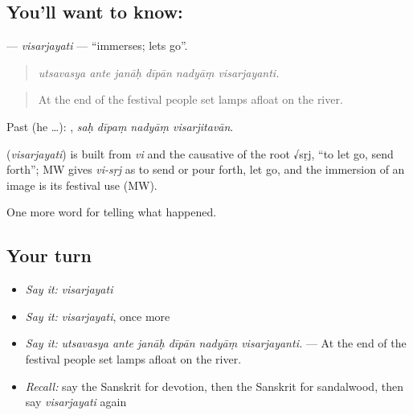 \subsection*{You'll want to know: }
\textbf{} — \emph{visarjayati} — \textquotedblleft{}immerses; lets go\textquotedblright{}.

\begin{quote}
     
\end{quote}

\begin{quote}
\emph{utsavasya ante janāḥ dīpān nadyāṃ visarjayanti.}
\end{quote}

\begin{quote}
At the end of the festival people set lamps afloat on the river.
\end{quote}

Past (he …):    , \emph{saḥ dīpaṃ nadyāṃ visarjitavān}.

\begin{cousinweb}
\textbf{} (\emph{visarjayati}) is built from \emph{vi} and the causative of the root √sṛj, \textquotedblleft{}to let go, send forth\textquotedblright{}; MW gives \emph{vi-sṛj} as to send or pour forth, let go, and the immersion of an image is its festival use (MW).
\end{cousinweb}

\begin{grammarlens}[title={What you've built}]
One more word for telling what happened.
\end{grammarlens}

\subsection*{Your turn}
\begin{itemize}
\raggedright
  \item \emph{Say it:} \emph{visarjayati}
  \item \emph{Say it:} \emph{visarjayati}, once more
  \item \emph{Say it:} \emph{utsavasya ante janāḥ dīpān nadyāṃ visarjayanti.} — At the end of the festival people set lamps afloat on the river.
  \item \emph{Recall:} say the Sanskrit for devotion, then the Sanskrit for sandalwood, then say \emph{visarjayati} again
\end{itemize}

